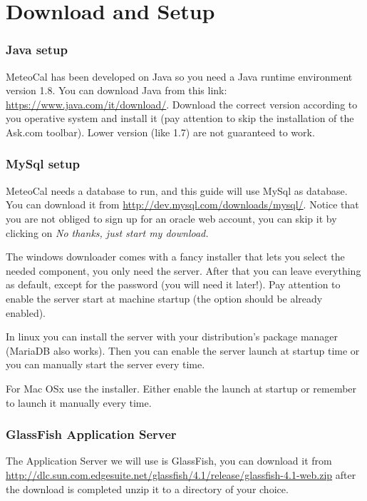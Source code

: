 \documentclass[10pt,a4paper,titlepage]{article}
\begin{document}


\tableofcontents

\pagebreak
\part{Download and Setup}

\section{Java setup}
MeteoCal has been developed on Java so you need a Java runtime environment version 1.8. You can download Java from this link: \url{https://www.java.com/it/download/}. Download the correct version according to you operative system and install it (pay attention to skip the installation of the Ask.com toolbar). Lower version (like 1.7) are not guaranteed to work.

\section{MySql setup}
MeteoCal needs a database to run, and this guide will use MySql as database. You can download it from \url{http://dev.mysql.com/downloads/mysql/}. Notice that you are not obliged to sign up for an oracle web account, you can skip it by clicking on \emph{No thanks, just start my download.}

The windows downloader comes with a fancy installer that lets you select the needed component, you only need the server. After that you can leave everything as default, except for the password (you will need it later!). Pay attention to enable the server start at machine startup (the option should be already enabled).

In linux you can install the server with your distribution's package manager (MariaDB also works). Then you can enable the server launch at startup time or you can manually start the server every time.

For Mac OSx use the installer. Either enable the launch at startup or remember to launch it manually every time.
 
\section{GlassFish Application Server}
The Application Server we will use is GlassFish, you can download it from \url{http://dlc.sun.com.edgesuite.net/glassfish/4.1/release/glassfish-4.1-web.zip} after the download is completed unzip it to a directory of your choice.
\end{document}
